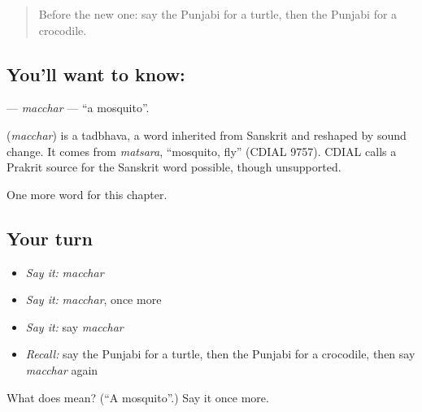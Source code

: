 \label{lesson:PA-C131-macchar}



\begin{quote}
Before the new one: say the Punjabi for a turtle, then the Punjabi for a crocodile.
\end{quote}

\subsection*{You'll want to know: }
\textbf{} — \emph{macchar} — \textquotedblleft{}a mosquito\textquotedblright{}.

\begin{cousinweb}
\textbf{} (\emph{macchar}) is a tadbhava, a word inherited from Sanskrit and reshaped by sound change. It comes from \emph{matsara}, \textquotedblleft{}mosquito, fly\textquotedblright{} (CDIAL 9757). CDIAL calls a Prakrit source for the Sanskrit word possible, though unsupported.
\end{cousinweb}

\begin{grammarlens}[title={What you've built}]
One more word for this chapter.
\end{grammarlens}

\subsection*{Your turn}
\begin{itemize}
\raggedright
  \item \emph{Say it:} \emph{macchar}
  \item \emph{Say it:} \emph{macchar}, once more
  \item \emph{Say it:} say \emph{macchar}
  \item \emph{Recall:} say the Punjabi for a turtle, then the Punjabi for a crocodile, then say \emph{macchar} again
\end{itemize}

\begin{tcolorbox}[breakable,colback=teal!4,colframe=teal!35!black,title={Before you move on}]
What does  mean? (\textquotedblleft{}A mosquito\textquotedblright{}.) Say it once more.
\end{tcolorbox}
